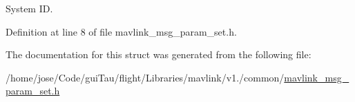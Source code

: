 System I\-D. 



Definition at line 8 of file mavlink\-\_\-msg\-\_\-param\-\_\-set.\-h.



The documentation for this struct was generated from the following file\-:\begin{DoxyCompactItemize}
\item 
/home/jose/\-Code/gui\-Tau/flight/\-Libraries/mavlink/v1./common/\hyperlink{mavlink__msg__param__set_8h}{mavlink\-\_\-msg\-\_\-param\-\_\-set.\-h}\end{DoxyCompactItemize}
